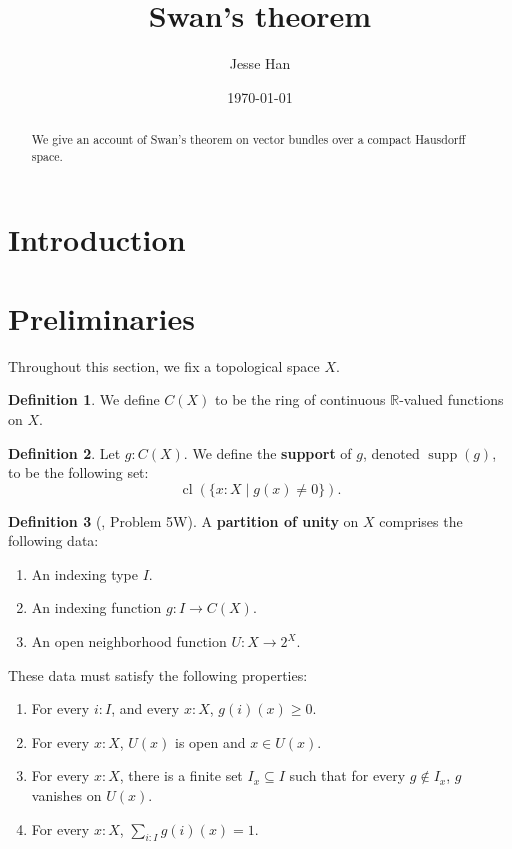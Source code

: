 \documentclass[11pt]{article}
\newcommand{\R}{\mathbb{R}}
\theoremstyle{plain}
\theoremstyle{definition}
\newtheorem{definition}{Definition}[section]
\newcommand{\cl}{\operatorname{cl}}
\newcommand{\supp}{\operatorname{supp}}
\begin{document}
\title{Swan's theorem}
\author{Jesse Han}
\date{\today}

\maketitle

\begin{abstract}
We give an account of Swan's theorem on vector bundles over a compact Hausdorff space.
\end{abstract}

\section*{Introduction}

\section{Preliminaries}
Throughout this section, we fix a topological space \(X\).


\begin{definition}\label{def:cts-functions}
  We define \(C(X)\) to be the ring of continuous \(\R\)-valued functions on \(X\).
\end{definition}

\begin{definition}\label{def:support}
  Let \(g : C(X)\). We define the \textbf{support} of \(g\), denoted \(\supp(g)\), to be the following set:
  \[ \cl \left( \{ x : X \mid g(x) \neq 0 \} \right).\]
\end{definition}

\begin{definition}[\cite{kelley2017general}, Problem 5W]\label{def:partition-of-unity}
  A \textbf{partition of unity} on \(X\) comprises the following data:
  \begin{enumerate}[label={(\roman*)}]
  \item An indexing type \(I\).
  \item An indexing function \(g : I \to C(X)\).
  \item An open neighborhood function \(U : X \to 2^X\).
  \end{enumerate}

  These data must satisfy the following properties:

  \begin{enumerate}[label={(\alph*)}]
  \item For every \(i : I\), and every \(x : X\), \(g(i)(x) \geq 0\).
  \item For every \(x : X\), \(U(x)\) is open and \(x \in U(x)\).
  \item For every \(x : X\), there is a finite set \(I_x \subseteq I\) such that for every \(g \notin I_x\), \(g\) vanishes on \(U(x)\).
  \item For every \(x : X\), \(\displaystyle \sum_{i : I} g(i)(x) = 1\).
  \end{enumerate}
\end{definition}
\end{document}
